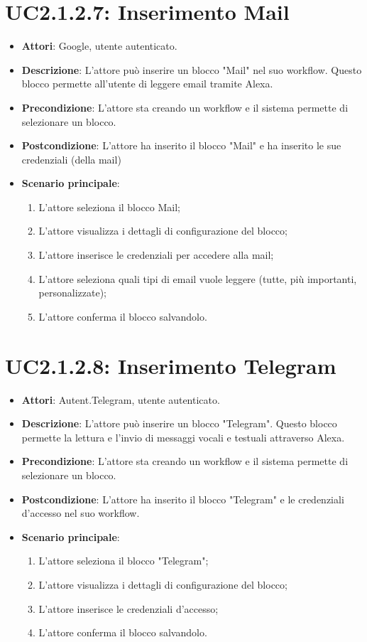 \section{UC2.1.2.7: Inserimento Mail}
\label{UC2.1.2.7}
\begin{itemize}
	\item \textbf{Attori}: Google, utente autenticato.
	\item \textbf{Descrizione}: L'attore può inserire un blocco "Mail" nel suo workflow. Questo blocco permette all'utente di leggere email tramite Alexa.
	\item \textbf{Precondizione}: L'attore sta creando un workflow e il sistema permette di selezionare un blocco.
	\item \textbf{Postcondizione}: L'attore ha inserito il blocco "Mail" e ha inserito le sue credenziali (della mail)
	\item \textbf{Scenario principale}:
	\begin{enumerate} \item L'attore seleziona il blocco Mail;  \item L'attore visualizza i dettagli di configurazione del blocco; \item  L'attore inserisce le credenziali per accedere alla mail;  \item  L'attore seleziona quali tipi di email vuole leggere (tutte, più importanti, personalizzate); \item L'attore conferma il blocco salvandolo.\end{enumerate}
\end{itemize}

\section{UC2.1.2.8: Inserimento Telegram}
\label{UC2.1.2.8}
\begin{itemize}
	\item \textbf{Attori}: Autent.Telegram, utente autenticato.
	\item \textbf{Descrizione}: L'attore può inserire un blocco "Telegram". Questo blocco permette la lettura e l'invio di messaggi vocali e testuali attraverso Alexa.
	\item \textbf{Precondizione}: L'attore sta creando un workflow e il sistema permette di selezionare un blocco.
	\item \textbf{Postcondizione}: L'attore ha inserito il blocco "Telegram" e le credenziali d'accesso nel suo workflow.
	\item \textbf{Scenario principale}:
	\begin{enumerate} \item L'attore seleziona il blocco "Telegram"; \item L'attore visualizza i dettagli di configurazione del blocco; \item  L'attore inserisce le credenziali d'accesso; \item L'attore conferma il blocco salvandolo.\end{enumerate}
\end{itemize}

